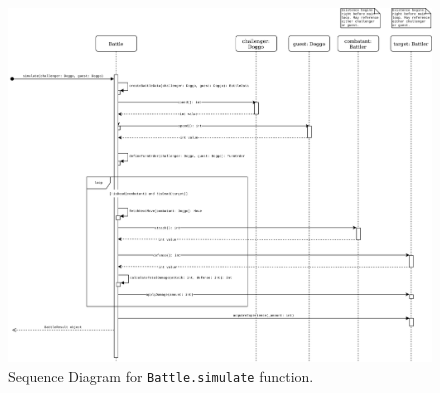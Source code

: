 \documentclass{article}
\begin{document}
    \begin{figure}[h]
        \centering{}
        \includegraphics[width=1\textwidth]{img/DoggoChain - simulate SD}
        \caption{%
            Sequence Diagram for \texttt{Battle.simulate}
            function.~\label{fig:simulateSD}
        }
    \end{figure}
\end{document}
